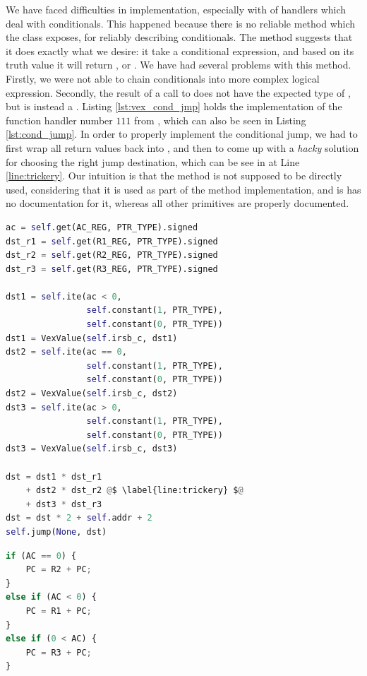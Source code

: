 We have faced difficulties in implementation, especially with of handlers which deal with conditionals. This happened because there is no reliable method which the  class exposes, for reliably describing conditionals. The  method suggests that it does exactly what we desire: it take a conditional expression, and based on its truth value it will return , or . We have had several problems with this method. Firstly, we were not able to chain conditionals into more complex logical expression. Secondly, the result of a call to  does not have the expected type of , but is instead a . Listing \ref{lst:vex_cond_jmp} holds the implementation of the function handler number $111$ from , which can also be seen in Listing \ref{lst:cond_jump}. In order to properly implement the conditional jump, we had to first wrap all  return values back into , and then to come up with a \emph{hacky} solution for choosing the right jump destination, which can be see in at Line \ref{line:trickery}. Our intuition is that the  method is not supposed to be directly used, considering that it is used as part of the  method implementation, and is has no documentation for it, whereas all other primitives are properly documented.

\begin{center}

\begin{minipage}[t]{.60\textwidth}
\begin{lstlisting}[language=python, label={lst:vex_cond_jmp}, caption={TODO}]
ac = self.get(AC_REG, PTR_TYPE).signed
dst_r1 = self.get(R1_REG, PTR_TYPE).signed
dst_r2 = self.get(R2_REG, PTR_TYPE).signed
dst_r3 = self.get(R3_REG, PTR_TYPE).signed

dst1 = self.ite(ac < 0,
                self.constant(1, PTR_TYPE),
                self.constant(0, PTR_TYPE))
dst1 = VexValue(self.irsb_c, dst1)
dst2 = self.ite(ac == 0,
                self.constant(1, PTR_TYPE),
                self.constant(0, PTR_TYPE))
dst2 = VexValue(self.irsb_c, dst2)
dst3 = self.ite(ac > 0,
                self.constant(1, PTR_TYPE),
                self.constant(0, PTR_TYPE))
dst3 = VexValue(self.irsb_c, dst3)

dst = dst1 * dst_r1 
    + dst2 * dst_r2 @$ \label{line:trickery} $@
    + dst3 * dst_r3
dst = dst * 2 + self.addr + 2
self.jump(None, dst)
\end{lstlisting}
\end{minipage}
\hspace{1.3cm}
\begin{minipage}[t]{.27\textwidth}
\begin{lstlisting}[language=python, label={lst:cond_jmp}, caption={TODO}]
if (AC == 0) {
    PC = R2 + PC;
}
else if (AC < 0) {
    PC = R1 + PC;
}
else if (0 < AC) {
    PC = R3 + PC;
}
\end{lstlisting}
\end{minipage}

\end{center}

